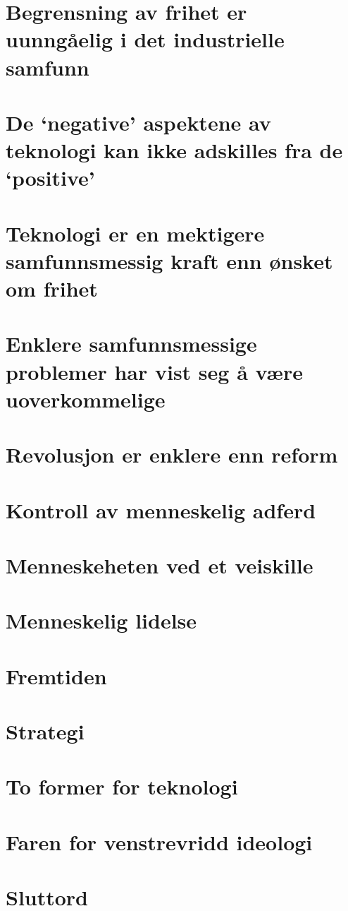 \documentclass[oneside]{book}
\begin{document}
\chapter{Begrensning av frihet er uunngåelig i det industrielle samfunn}

\chapter{De `negative' aspektene av teknologi kan ikke adskilles fra de `positive'}

\chapter{Teknologi er en mektigere samfunnsmessig kraft enn ønsket om frihet}

\chapter{Enklere samfunnsmessige problemer har vist seg å være uoverkommelige}

\chapter{Revolusjon er enklere enn reform}

\chapter{Kontroll av menneskelig adferd}

\chapter{Menneskeheten ved et veiskille}

\chapter{Menneskelig lidelse}

\chapter{Fremtiden}

\chapter{Strategi}

\chapter{To former for teknologi}

\chapter{Faren for venstrevridd ideologi}

\chapter{Sluttord}
\end{document}

